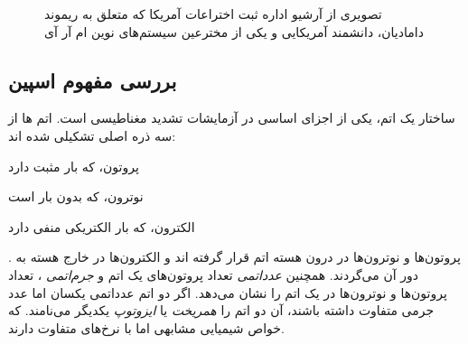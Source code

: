 \begin{figure}
	\centering
	{}
	\caption{تصویری از آرشیو اداره ثبت اختراعات آمریکا که متعلق به ریموند دامادیان، دانشمند آمریکایی و یکی از مخترعین سیستم‌های نوین ام آر آی}
	\label{fig:Damadian_invention}
\end{figure}


\subsection{بررسی مفهوم اسپین}
 

ساختار یک اتم، یکی از اجزای اساسی در آزمایشات تشدید مغناطیسی است. اتم ها از سه ذره اصلی 
تشکیلی شده اند:
\begin{enuminline}
	\item پروتون، که بار مثبت دارد
	\item نوترون، که بدون بار است
	\item الکترون، که بار الکتریکی منفی دارد
\end{enuminline}.
پروتون‌ها و نوترون‌ها در درون هسته اتم قرار گرفته اند و الکترون‌ها در خارج هسته به دور آن می‌گردند.
همچنین \textit{عدد‌اتمی}
تعداد پروتون‌های یک اتم و \textit{جرم‌اتمی}
، تعداد پروتون‌ها و نوترون‌ها در یک اتم را نشان می‌دهد. اگر دو اتم عدد‌‌اتمی یکسان اما عدد جرمی متفاوت داشته باشند، آن دو اتم را \textit{همریخت} یا \textit{ایزوتوپ}
یکدیگر می‌نامند. که خواص شیمیایی مشابهی اما با نرخ‌های متفاوت دارند.


